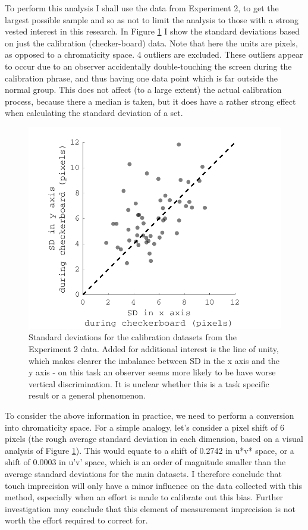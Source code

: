 To perform this analysis I shall use the data from Experiment 2, to get the largest possible sample and so as not to limit the analysis to those with a strong vested interest in this research. In Figure \ref{fig:BMtouch} I show the standard deviations based on just the calibration (checker-board) data. Note that here the units are pixels, as opposed to a chromaticity space. 4 outliers are excluded. These outliers appear to occur due to an observer accidentally double-touching the screen during the calibration phrase, and thus having one data point which is far outside the normal group. This does not affect (to a large extent) the actual calibration process, because there a median is taken, but it does have a rather strong effect when calculating the standard deviation of a set.

\begin{figure}[hbtp]
\includegraphics[max width=\textwidth]{figs/tablet/BMtouch.pdf} 
\caption{Standard deviations for the calibration datasets from the Experiment 2 data. Added for additional interest is the line of unity, which makes clearer the imbalance between SD in the x axis and the y axis - on this task an observer seems more likely to be have worse vertical discrimination. It is unclear whether this is a task specific result or a general phenomenon.}
\label{fig:BMtouch}
\end{figure}

To consider the above information in practice, we need to perform a conversion into chromaticity space. For a simple analogy, let's consider a pixel shift of 6 pixels (the rough average standard deviation in each dimension, based on a visual analysis of Figure \ref{fig:BMtouch}). This would equate to a shift of 0.2742 in u*v* space, or a shift of 0.0003 in u'v' space, which is an order of magnitude smaller than the average standard deviations for the main datasets. I therefore conclude that touch imprecision will only have a minor influence on the data collected with this method, especially when an effort is made to calibrate out this bias. Further investigation may conclude that this element of measurement imprecision is not worth the effort required to correct for.

